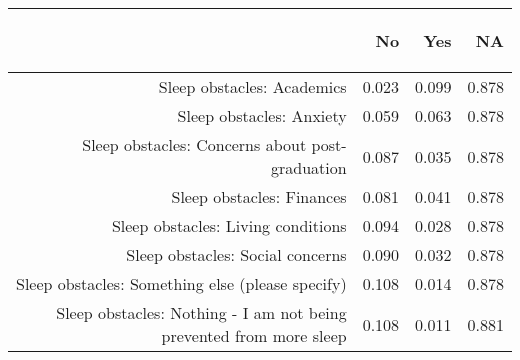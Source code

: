 \documentclass{article}\usepackage[]{graphicx}\usepackage[]{color}
\begin{document}
\begin{table}[ht]
\centering
\begin{tabular}{rrrr}
  \hline
 & \begin{sideways} No  \end{sideways} & \begin{sideways} Yes  \end{sideways} & \begin{sideways} NA  \end{sideways} \\ 
  \hline
Sleep obstacles: Academics & 0.023 & 0.099 & 0.878 \\ 
  Sleep obstacles: Anxiety & 0.059 & 0.063 & 0.878 \\ 
  Sleep obstacles: Concerns about post-graduation & 0.087 & 0.035 & 0.878 \\ 
  Sleep obstacles: Finances & 0.081 & 0.041 & 0.878 \\ 
  Sleep obstacles: Living conditions & 0.094 & 0.028 & 0.878 \\ 
  Sleep obstacles: Social concerns & 0.090 & 0.032 & 0.878 \\ 
  Sleep obstacles: Something else (please specify) & 0.108 & 0.014 & 0.878 \\ 
  Sleep obstacles: Nothing - I am not being prevented from more sleep & 0.108 & 0.011 & 0.881 \\ 
   \hline
\end{tabular}
\end{table}
\end{document}
